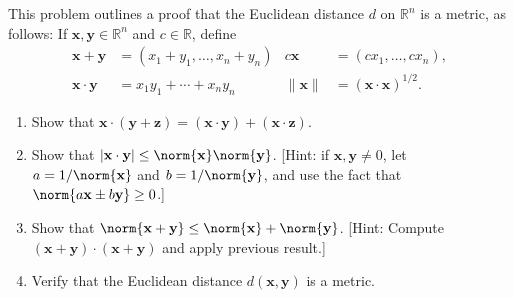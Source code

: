 \documentclass[11pt]{article}
\renewcommand{\b}[1]{\ensuremath{\mathbf{#1}}}
\begin{document}
\begin{homeworkProblem}
    This problem outlines a proof that the Euclidean distance $d$ on $\mathbb{R}^n$ is a metric, as follows: If
    $\b{x}, \b{y} \in \mathbb{R}^n$ and $c \in \mathbb{R}$, define
    \begin{align*}
        \b{x} + \b{y}     & =\left(x_1+y_1, \ldots, x_n+y_n\right) & c \b{x}   & =\left(c x_1, \ldots, c x_n\right), \\
        \b{x} \cdot \b{y} & =x_1 y_1+\cdots+x_n y_n                & \|\b{x}\| & =(\b{x} \cdot \b{x})^{1 / 2} .
    \end{align*}
    \begin{enumerate}[label=(\alph*), itemsep=5pt]
        \item Show that $\b{x} \cdot (\b{y} + \b{z}) = (\b{x} \cdot \b{y}) + (\b{x} \cdot \b{z})$.
        \item Show that $|\b{x} \cdot \b{y}| \leq \norm{\b{x}} \norm{\b{y}}$. [Hint: if $\b{x}, \b{y} \neq 0$,
                      let $a = 1/\norm{\b{x}}$ and $b = 1/\norm{\b{y}}$, and use the fact that $\norm{a\b{x} \pm b \b{y}} \geq 0$.]
        \item Show that $\norm{\b{x} + \b{y}} \leq \norm{\b{x}} + \norm{\b{y}}$. [Hint: Compute $(\b{x} + \b{y}) \cdot (\b{x} + \b{y})$
                      and apply previous result.]
        \item Verify that the Euclidean distance $d(\b{x}, \b{y})$ is a metric.
    \end{enumerate} \vspace{1\baselineskip}

    \solution


\end{homeworkProblem}
\end{document}
